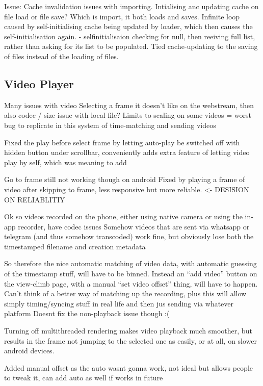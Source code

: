 Issue: Cache invalidation issues with importing. Intialising anc updating cache on file load or file save? Which is import, it both loads and saves.
Infinite loop caused by self-initialising cache being updated by loader, which then causes the self-initialisation again. - selfinitialisaion checking for null, then reeiving full list, rather than asking for its list to be populated. Tied cache-updating to the saving of files instead of the loading of files.




\subsection{Video Player}

Many issues with video
Selecting a frame it doesn’t like on the webstream, then also codec / size issue with local file?
Limits to scaling on some videos = worst bug to replicate in this system of time-matching and sending videos

Fixed the play before select frame by letting auto-play be switched off with hidden button under scrollbar, conveniently adds extra feature of letting video play by self, which was meaning to add

Go to frame still not working though on android
Fixed by playing a frame of video after skipping to frame, less responsive but more reliable. <- DESISION ON RELIABLITIY




Ok so videos recorded on the phone, either using native camera or using the in-app recorder, have codec issues
Somehow videos that are sent via whatsapp or telegram (and thus somehow transcoded) work fine, but obviously lose both the timestamped filename and creation metadata


So therefore the nice automatic matching of video data, with automatic guessing of the timestamp stuff, will have to be binned.
Instead an “add video” button on the view-climb page, with a manual “set video offset” thing, will have to happen.
Can’t think of a better way of matching up the recording, plus this will allow simply timing/syncing stuff in real life and then jus sending via whatever platform
Doesnt fix the non-playback issue though :(

Turning off multithreaded rendering makes video playback much smoother, but results in the frame not jumping to the selected one as easily, or at all, on slower android devices.


Added manual offset as the auto wasnt gonna work, not ideal but allows people to tweak it, can add auto as well if works in future








